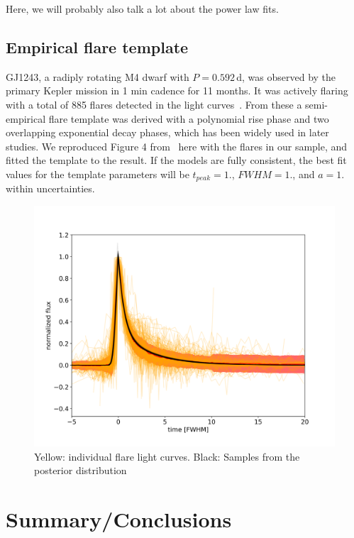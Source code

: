 \documentclass{aastex62}
\begin{document}
Here, we will probably also talk a lot about the power law fits. 

\subsection{Empirical flare template}\label{subsec:template}
GJ1243, a radiply rotating M4 dwarf with $P=0.592$\,d, was observed by the primary Kepler mission in 1 min cadence for 11 months. It was actively flaring with a total of 885 flares detected in the light curves~\citep{davenport2014}. From these a semi-empirical flare template was derived with a polynomial rise phase and two overlapping exponential decay phases, which has been widely used in later studies. We reproduced Figure 4 from~\citet{davenport2014} here with the flares in our sample, and fitted the template to the result. If the models are fully consistent, the best fit values for the template parameters will be $t_{peak}=1.$, $FWHM=1.$, and $a=1.$ within uncertainties.

\begin{figure}
	\includegraphics[width=0.5\columnwidth]{11_03_2020_11_15_all_davenport_fit_median_norel.png}
    \caption{Yellow: individual flare light curves. Black: Samples from the posterior distribution}
    \label{fig:template}
\end{figure}


\section{Summary/Conclusions} \label{sec:conclusion}


\acknowledgments

\vspace{5mm}
\facilities{}


 
\end{document}

